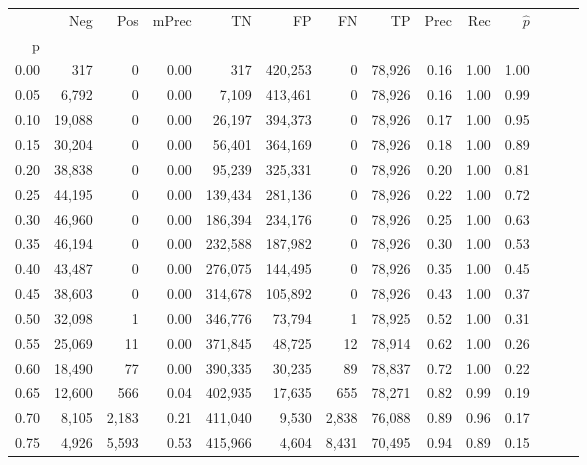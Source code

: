 \begin{tabular}{rrrrrrrrrrrrrr}
\toprule
{} &     Neg &     Pos & mPrec &       TN &       FP &      FN &      TP &  Prec &   Rec & $\hat{p}$ \\
p    &         &         &       &          &          &         &         &       &       &           \\
\midrule
0.00 &     317 &       0 &  0.00 &      317 &  420,253 &       0 &  78,926 &  0.16 &  1.00 &      1.00 \\
0.05 &   6,792 &       0 &  0.00 &    7,109 &  413,461 &       0 &  78,926 &  0.16 &  1.00 &      0.99 \\
0.10 &  19,088 &       0 &  0.00 &   26,197 &  394,373 &       0 &  78,926 &  0.17 &  1.00 &      0.95 \\
0.15 &  30,204 &       0 &  0.00 &   56,401 &  364,169 &       0 &  78,926 &  0.18 &  1.00 &      0.89 \\
0.20 &  38,838 &       0 &  0.00 &   95,239 &  325,331 &       0 &  78,926 &  0.20 &  1.00 &      0.81 \\
0.25 &  44,195 &       0 &  0.00 &  139,434 &  281,136 &       0 &  78,926 &  0.22 &  1.00 &      0.72 \\
0.30 &  46,960 &       0 &  0.00 &  186,394 &  234,176 &       0 &  78,926 &  0.25 &  1.00 &      0.63 \\
0.35 &  46,194 &       0 &  0.00 &  232,588 &  187,982 &       0 &  78,926 &  0.30 &  1.00 &      0.53 \\
0.40 &  43,487 &       0 &  0.00 &  276,075 &  144,495 &       0 &  78,926 &  0.35 &  1.00 &      0.45 \\
0.45 &  38,603 &       0 &  0.00 &  314,678 &  105,892 &       0 &  78,926 &  0.43 &  1.00 &      0.37 \\
0.50 &  32,098 &       1 &  0.00 &  346,776 &   73,794 &       1 &  78,925 &  0.52 &  1.00 &      0.31 \\
0.55 &  25,069 &      11 &  0.00 &  371,845 &   48,725 &      12 &  78,914 &  0.62 &  1.00 &      0.26 \\
0.60 &  18,490 &      77 &  0.00 &  390,335 &   30,235 &      89 &  78,837 &  0.72 &  1.00 &      0.22 \\
0.65 &  12,600 &     566 &  0.04 &  402,935 &   17,635 &     655 &  78,271 &  0.82 &  0.99 &      0.19 \\
0.70 &   8,105 &   2,183 &  0.21 &  411,040 &    9,530 &   2,838 &  76,088 &  0.89 &  0.96 &      0.17 \\
0.75 &   4,926 &   5,593 &  0.53 &  415,966 &    4,604 &   8,431 &  70,495 &  0.94 &  0.89 &      0.15 \\

\end{tabular}
